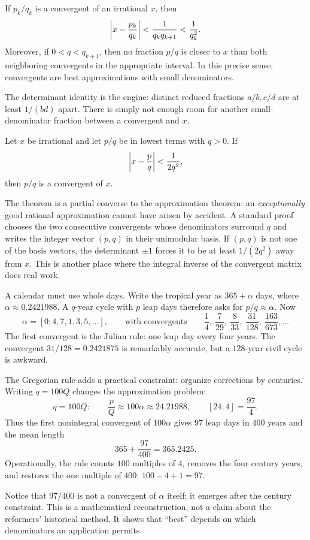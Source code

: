 \begin{theorem}
If $p_k/q_k$ is a convergent of an irrational $x$, then
\[
\left|x-\frac{p_k}{q_k}\right|<\frac1{q_kq_{k+1}}<\frac1{q_k^2}.
\]
Moreover, if $0<q<q_{k+1}$, then no fraction $p/q$ is closer to $x$ than both neighboring convergents in the appropriate interval. In this precise sense, convergents are best approximations with small denominators.
\end{theorem}

The determinant identity is the engine: distinct reduced fractions $a/b,c/d$ are at least $1/(bd)$ apart. There is simply not enough room for another small-denominator fraction between a convergent and $x$.

\begin{theorem}
Let $x$ be irrational and let $p/q$ be in lowest terms with $q>0$. If
\[
  \left|x-\frac pq\right|<\frac{1}{2q^2},
\]
then $p/q$ is a convergent of $x$.
\end{theorem}

The theorem is a partial converse to the approximation theorem: an
\emph{exceptionally} good rational approximation cannot have arisen by
accident. A standard proof chooses the two consecutive convergents whose
denominators surround $q$ and writes the integer vector $(p,q)$ in their
unimodular basis. If $(p,q)$ is not one of the basis vectors, the determinant
$\pm1$ forces it to be at least $1/(2q^2)$ away from $x$. This is another place
where the integral inverse of the convergent matrix does real work.

\begin{labbox}[title={Aside: continued fractions keep the calendar},breakable=false]
A calendar must use whole days. Write the tropical year as $365+\alpha$ days,
where $\alpha\approx0.2421988$. A $q$-year cycle with $p$ leap days therefore
asks for $p/q\approx\alpha$. Now
\[
 \alpha=[0;4,7,1,3,5,\dots],
 \qquad\text{with convergents}\qquad
 \frac14,\ \frac7{29},\ \frac8{33},\ \frac{31}{128},\
 \frac{163}{673},\dots
\]
The first convergent is the Julian rule: one leap day every four years. The
convergent $31/128=0.2421875$ is remarkably accurate, but a $128$-year civil
cycle is awkward.

The Gregorian rule adds a practical constraint: organize corrections by
centuries. Writing $q=100Q$ changes the approximation problem:
\[
 q=100Q:\qquad \frac pQ\approx100\alpha\approx24.21988,
 \qquad [24;4]=\frac{97}{4}.
\]
Thus the first nonintegral convergent of $100\alpha$ gives $97$ leap days in
$400$ years and the mean length
\[
  365+\frac{97}{400}=365.2425.
\]
Operationally, the rule counts $100$ multiples of $4$, removes the four
century years, and restores the one multiple of $400$: $100-4+1=97$.

Notice that $97/400$ is not a convergent of $\alpha$ itself; it emerges after
the century constraint. This is a mathematical reconstruction, not a claim
about the reformers' historical method. It shows that ``best'' depends on which
denominators an application permits.
\end{labbox}

